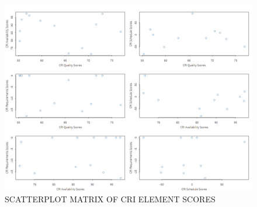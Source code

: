 \documentclass[SDSUThesis.tex]{subfiles}
\begin{document}
        \begin{figure}[htb]
            \centering
            \includegraphics[scale=.25]{images/correlation.png}
            \caption{SCATTERPLOT MATRIX OF CRI ELEMENT SCORES}
            \label{fig:correlation_cri}
        \end{figure}
        
\end{document}
